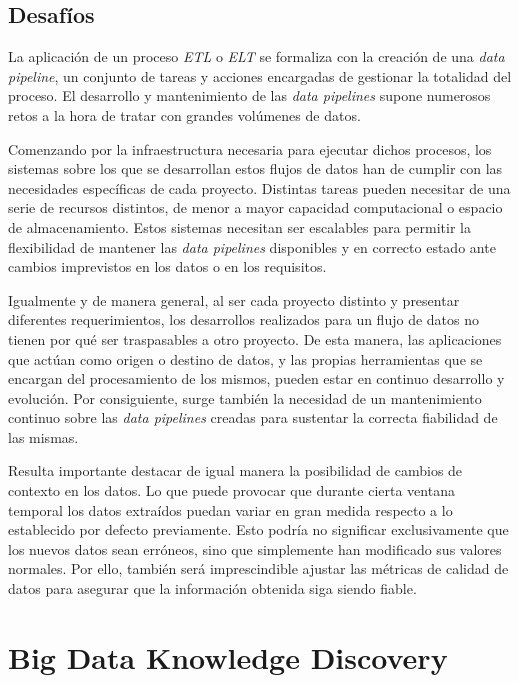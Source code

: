 \subsection{Desafíos}

La aplicación de un proceso \textit{ETL} o \textit{ELT} se formaliza con la creación de una \textit{data pipeline}, un conjunto de tareas y acciones encargadas de gestionar la totalidad del proceso. El desarrollo y mantenimiento de las \textit{data pipelines} supone numerosos retos a la hora de tratar con grandes volúmenes de datos.

Comenzando por la infraestructura necesaria para ejecutar dichos procesos, los sistemas sobre los que se desarrollan estos flujos de datos han de cumplir con las necesidades específicas de cada proyecto. Distintas tareas pueden necesitar de una serie de recursos distintos, de menor a mayor capacidad computacional o espacio de almacenamiento. Estos sistemas necesitan ser escalables para permitir la flexibilidad de mantener las \textit{data pipelines} disponibles y en correcto estado ante cambios imprevistos en los datos o en los requisitos.

Igualmente y de manera general, al ser cada proyecto distinto y presentar diferentes requerimientos, los desarrollos realizados para un flujo de datos no tienen por qué ser traspasables a otro proyecto. De esta manera, las aplicaciones que actúan como origen o destino de datos, y las propias herramientas que se encargan del procesamiento de los mismos, pueden estar en continuo desarrollo y evolución. Por consiguiente, surge también la necesidad de un mantenimiento continuo sobre las \textit{data pipelines} creadas para sustentar la correcta fiabilidad de las mismas.

Resulta importante destacar de igual manera la posibilidad de cambios de contexto en los datos. Lo que puede provocar que durante cierta ventana temporal los datos extraídos puedan variar en gran medida respecto a lo establecido por defecto previamente. Esto podría no significar exclusivamente que los nuevos datos sean erróneos, sino que simplemente han modificado sus valores normales. Por ello, también será imprescindible ajustar las métricas de calidad de datos para asegurar que la información obtenida siga siendo fiable.

\section{Big Data Knowledge Discovery}

